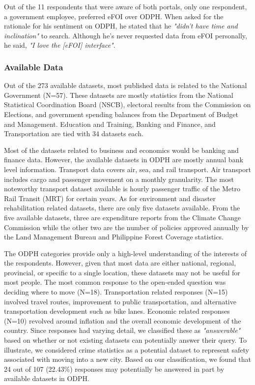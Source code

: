 \documentclass{sigchi}
\begin{document}
Out of the 11 respondents that were aware of both portals, only one respondent, a government employee, preferred eFOI over ODPH. When asked for the rationale for his sentiment on ODPH, he stated that he \textit{"didn't have time and inclination"} to search. Although he's never requested data from eFOI personally, he said, \textit{"I love the [eFOI] interface"}. 

\subsubsection{Available Data}
Out of the 273 available datasets, most published data is related to the National Government (N=57). These datasets are mostly statistics from the National Statistical Coordination Board (NSCB), electoral results from the Commission on Elections, and government spending balances from the Department of Budget and Management. Education and Training, Banking and Finance, and Transportation are tied with 34 datasets each.

Most of the datasets related to business and economics would be banking and finance data. However, the available datasets in ODPH are mostly annual bank level information. Transport data covers air, sea, and rail transport. Air transport includes cargo and passenger movement on a monthly granularity. The most noteworthy transport dataset available is hourly passenger traffic of the Metro Rail Transit (MRT) for certain years. As for environment and disaster rehabilitation related datasets, there are only five datasets available. From the five available datasets, three are expenditure reports from the Climate Change Commission while the other two are the number of policies approved annually by the Land Management Bureau and Philippine Forest Coverage statistics.


The ODPH categories provide only a high-level understanding of the interests of the respondents. However, given that most data are either national, regional, provincial, or specific to a single location, these datasets may not be useful for most people. The most common response to the open-ended question was deciding where to move (N=18). Transportation related responses (N=15) involved travel routes, improvement to public transportation, and alternative transportation development such as bike lanes. Economic related responses (N=10) revolved around inflation and the overall economic development of the country. Since responses had varying detail, we classified these as \textit{"answerable"} based on whether or not existing datasets can potentially answer their query. To illustrate, we considered crime statistics as a potential dataset to represent safety associated with moving into a new city. Based on our classification, we found that 24 out of 107 (22.43\%) responses may potentially be answered in part by available datasets in ODPH. 
\end{document}
